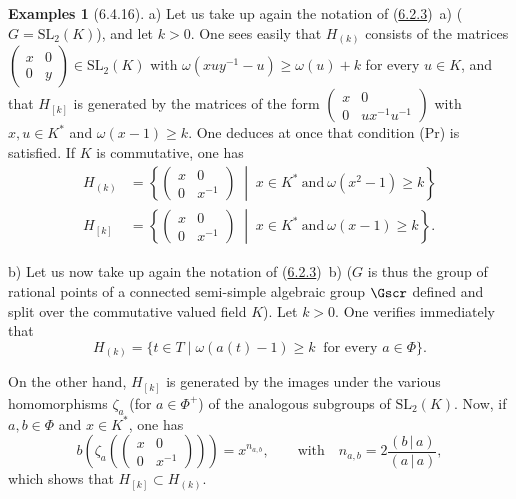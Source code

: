 \documentclass[12pt,a4paper,oneside,english]{smfart}
\makeatletter
\newcommand{\btanchor}[1]{\leavevmode\Hy@raisedlink{\hypertarget{bt:#1}{}}}
\newcommand{\btpageanchor}[1]{\Hy@raisedlink{\hypertarget{p:#1}{}}}
\newcommand{\btref}[1]{\hyperlink{bt:#1}{#1}}
\newcommand{\btpage}[1]{\marginnote{p.~#1}\btpageanchor{#1}}
\newcommand{\pmark}[1]{\btpage{#1}}
\theoremstyle{definition}
\theoremstyle{bt}
\newtheorem{exams}{Examples}
\makeatother
\begin{document}
\begin{exams}[6.4.16]\btanchor{6.4.16}
a) Let us take up again the notation of (\btref{6.2.3})~a) ($G=\mathrm{SL}_2(K)$),
and let $k>0$. One sees easily that $H_{(k)}$ consists of the matrices
$\begin{pmatrix}x&0\\0&y\end{pmatrix}\in\mathrm{SL}_2(K)$ with
$\omega(xuy^{-1}-u)\geq\omega(u)+k$ for every $u\in K$, and that $H_{[k]}$
is generated by the matrices of the form
$\begin{pmatrix}x&0\\0&ux^{-1}u^{-1}\end{pmatrix}$ with $x,u\in K^{*}$ and
$\omega(x-1)\geq k$. One deduces at once that condition (Pr) is satisfied.
If $K$ is commutative, one has
\begin{align*}
  H_{(k)}&=\left\{\begin{pmatrix}x&0\\0&x^{-1}\end{pmatrix}
    \;\middle|\; x\in K^{*}\ \text{and}\ \omega(x^2-1)\geq k\right\}\\
  H_{[k]}&=\left\{\begin{pmatrix}x&0\\0&x^{-1}\end{pmatrix}
    \;\middle|\; x\in K^{*}\ \text{and}\ \omega(x-1)\geq k\right\}.
\end{align*}

\pmark{140}
b) Let us now take up again the notation of (\btref{6.2.3})~b) ($G$ is thus the
group of rational points of a connected semi-simple algebraic group
$\Gscr$ defined and split over the commutative valued field $K$). Let
$k>0$. One verifies immediately that
\[
  H_{(k)}=\{t\in T\mid\omega(a(t)-1)\geq k\ \text{ for every }a\in\Phi\}.
\]

On the other hand, $H_{[k]}$ is generated by the images under the various
homomorphisms $\zeta_a$ (for $a\in\Phi^{+}$) of the analogous subgroups of
$\mathrm{SL}_2(K)$. Now, if $a,b\in\Phi$ and $x\in K^{*}$, one has
\[
  b\left(\zeta_a\left(\begin{pmatrix}x&0\\0&x^{-1}\end{pmatrix}\right)\right)    =x^{n_{a,b}},\qquad\text{with}\quad n_{a,b}=2\frac{(b\,|\,a)}{(a\,|\,a)},
\]
which shows that $H_{[k]}\subset H_{(k)}$.


\end{exams}
\end{document}
